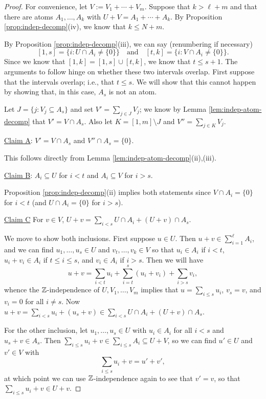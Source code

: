 \begin{proof}
	For convenience, let $V := V_1 + \cdots + V_m$.
	Suppose that $k > \ell + m$ and that there are atoms $A_1,\dots,A_k$ with $U+V = A_1 + \cdots + A_k$.
	By Proposition \ref{prop:indep-decomp}(iv), we know that $k \le N+m$.
	
	By Proposition \ref{prop:indep-decomp}(iii), we can say (renumbering if necessary)
	\[ [ 1,s ] =  \{ i: U\cap A_i \neq\{0\}\} \quad \textrm{and} \quad [ t,k ] = \{i: V\cap A_i \neq \{0\}\}. \]
	Since we know that $[ 1,k ] = [ 1,s ] \cup [ t,k ]$, we know that $t \le s+1$.
	The arguments to follow hinge on whether these two intervals overlap.  
	First suppose that the intervals overlap; i.e., that $t \le s$.
	We will show that this cannot happen by showing that, in this case, $A_s$ is not an atom.
	
	Let $J = \{ j: V_j \subseteq A_s \}$ and set $V' = \sum_{j\in J} V_j$; we know by Lemma \ref{lem:indep-atom-decomp} that $V' = V \cap A_s$.
	Also let $K = [ 1,m ] \setminus J$ and $V'' = \sum_{j\in K} V_j$.
	
	\noindent\underline{Claim A}: $V' = V\cap A_s$ and $V'' \cap A_s = \{0\}$. \label{cla}
	
	This follows directly from Lemma \ref{lem:indep-atom-decomp}(ii),(iii).
	
	\noindent\underline{Claim B}: $A_i \subseteq U$ for $i<t$ and $A_i \subseteq V$ for $i > s$. \label{clb}
	
	Proposition \ref{prop:indep-decomp}(ii) implies both statements since $V \cap A_i = \{0\}$ for $i<t$ (and $U\cap A_i = \{0\}$ for $i>s$).
	
	\noindent\underline{Claim C} For $v\in V$, $U+v = \sum\limits_{i<s} U\cap A_i + (U+v)\cap A_s$. \label{clc}
	
	We move to show both inclusions.
	First suppose $u\in U$. 
	Then $u+v \in \sum_{i=1}^\ell A_i$, and we can find $u_1,\dots, u_s\in U$ and $v_t,\dots, v_k\in V$ so that
	$u_i\in A_i$ if $i < t$, $u_i + v_i \in A_i$ if $t\le i \le s$, and $v_i \in A_i$ if $i > s$.
	Then we will have
	\[u+v = \sum_{i<t} u_i + \sum_{i=t}^{s} (u_i+v_i) + \sum_{i > s} v_i, \]
	whence the $\mathbb{Z}$-independence of $U,V_1,\dots,V_m$ implies that $u = \sum_{i\le s} u_i$, $v_s = v$, and $v_i = 0$ for all $i\neq s$.
	Now $u+v = \sum_{i<s} u_i + (u_s+v)\in \sum_{i<s} U\cap A_i + (U+v)\cap A_s$.
	
	For the other inclusion, let $u_1,\dots, u_s\in U$ with $u_i\in A_i$ for all $i<s$ and $u_s + v\in A_s$.
	Then $\sum_{i\le s} u_i +v \in \sum_{i\le s} A_i \subseteq U+V$, so we can find $u'\in U$ and $v'\in V$ with 
	\[\sum_{i\le s}u_i + v = u' + v',\]
	at which point we can use $\mathbb{Z}$-independence again to see that $v' = v$, so that $\sum_{i\le s} u_i + v\in U+v$.
	

\end{proof}
